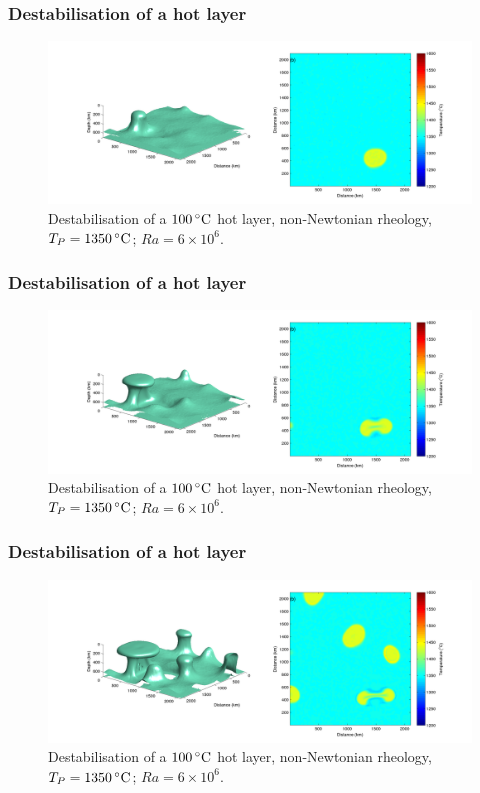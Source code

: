 \documentclass[aspectratio=169]{beamer}
\begin{document}
\begin{frame}
    \frametitle{Destabilisation of a hot layer}
    \begin{figure}
        \vspace{-.5cm}
        \includegraphics[width=0.85\paperwidth]{./figures/100hot/100hotbase_1.png}
        \caption{Destabilisation of a $100\rm\,^{\circ}C$ hot layer, non-Newtonian rheology, $T_{P}=1350\rm\,^{\circ}C$; $Ra = 6\times10^{6}$.}
    \end{figure}
\end{frame}

\begin{frame}
    \frametitle{Destabilisation of a hot layer}
    \begin{figure}
        \vspace{-.5cm}
        \includegraphics[width=0.85\paperwidth]{./figures/100hot/100hotbase_2.png}
        \caption{Destabilisation of a $100\rm\,^{\circ}C$ hot layer, non-Newtonian rheology, $T_{P}=1350\rm\,^{\circ}C$; $Ra = 6\times10^{6}$.}
    \end{figure}
\end{frame}

\begin{frame}
    \frametitle{Destabilisation of a hot layer}
    \begin{figure}
        \vspace{-.5cm}
        \includegraphics[width=0.85\paperwidth]{./figures/100hot/100hotbase_3.png}
        \caption{Destabilisation of a $100\rm\,^{\circ}C$ hot layer, non-Newtonian rheology, $T_{P}=1350\rm\,^{\circ}C$; $Ra = 6\times10^{6}$.}
    \end{figure}
\end{frame}
\end{document}
